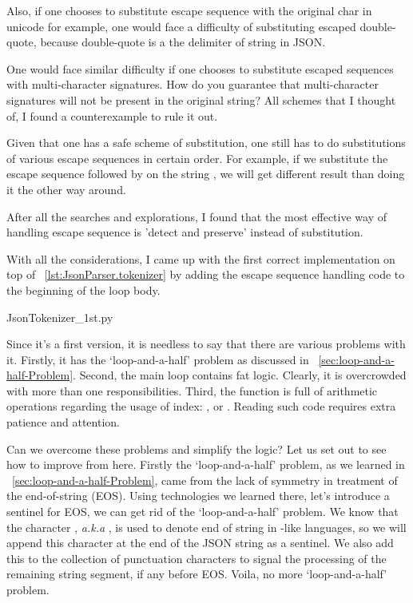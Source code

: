 Also, if one chooses to substitute escape sequence with the original char in unicode for example,
one would face a difficulty of substituting escaped double-quote,
because double-quote is a the delimiter of string in JSON\@.

One would face similar difficulty if one chooses to substitute escaped sequences with
multi-character signatures.
How do you guarantee that multi-character signatures will not be present in the original string?
All schemes that I thought of, I found a counterexample to rule it out.

Given that one has a safe scheme of substitution, one still has to do substitutions of
various escape sequences in certain order.
For example, if we substitute the escape sequence 
followed by  on the string ,
we will get different result than doing it the other way around.

After all the searches and explorations, I found that
the most effective way of handling escape sequence is 'detect and preserve'
instead of substitution.

With all the considerations, I came up with the first correct implementation on top of
~\autoref{lst:JsonParser.tokenizer} by adding the escape sequence handling code to the beginning of
the loop body.

{JsonTokenizer_1st.py}

Since it's a first version, it is needless to say that there are various problems with it.
Firstly, it has the `loop-and-a-half' problem as discussed in
~\autoref{sec:loop-and-a-half-Problem}.
Second, the main loop contains fat logic.
Clearly, it is overcrowded with more than one responsibilities.
Third, the function is full of arithmetic operations regarding the usage of index:
,  or .
Reading such code requires extra patience and attention.

Can we overcome these problems and simplify the logic?
Let us set out to see how to improve from here.
Firstly the `loop-and-a-half' problem, as we learned in ~\autoref{sec:loop-and-a-half-Problem},
came from the lack of symmetry in treatment of the end-of-string (EOS).
Using technologies we learned there, let's introduce a sentinel for EOS,
we can get rid of the `loop-and-a-half' problem.
We know that the character , \textit{a.k.a} ,
is used to denote end of string in -like languages,
so we will append this character at the end of the JSON string as a sentinel.
We also add this to the collection of punctuation characters to signal the processing of the
remaining string segment, if any before EOS\@.
Voila, no more `loop-and-a-half' problem.

